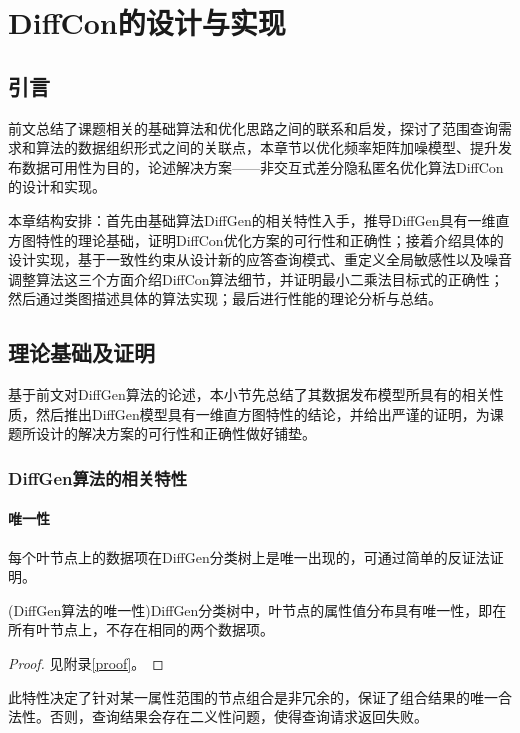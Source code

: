 
\raggedbottom
\chapter{DiffCon的设计与实现}
\label{chap:designandimpl}

\section{引言}

前文总结了课题相关的基础算法和优化思路之间的联系和启发，探讨了范围查询需求和算法的数据组织形式之间的关联点，本章节以优化频率矩阵加噪模型、提升发布数据可用性为目的，论述解决方案——非交互式差分隐私匿名优化算法DiffCon的设计和实现。

本章结构安排：首先由基础算法DiffGen的相关特性入手，推导DiffGen具有一维直方图特性的理论基础，证明DiffCon优化方案的可行性和正确性；接着介绍具体的设计实现，基于一致性约束从设计新的应答查询模式、重定义全局敏感性以及噪音调整算法这三个方面介绍DiffCon算法细节，并证明最小二乘法目标式的正确性；然后通过类图描述具体的算法实现；最后进行性能的理论分析与总结。

\section{理论基础及证明}

基于前文对DiffGen算法的论述，本小节先总结了其数据发布模型所具有的相关性质，然后推出DiffGen模型具有一维直方图特性的结论，并给出严谨的证明，为课题所设计的解决方案的可行性和正确性做好铺垫。

\subsection{DiffGen算法的相关特性}

\subsubsection{唯一性}

每个叶节点上的数据项在DiffGen分类树上是唯一出现的，可通过简单的反证法证明。
\begin{prop}
	\label{chap4_prop1}
	(DiffGen算法的唯一性)DiffGen分类树中，叶节点的属性值分布具有唯一性，即在所有叶节点上，不存在相同的两个数据项。
\end{prop}
\begin{proof}
	见附录\ref{proof}。
\end{proof}
此特性决定了针对某一属性范围的节点组合是非冗余的，保证了组合结果的唯一合法性。否则，查询结果会存在二义性问题，使得查询请求返回失败。

